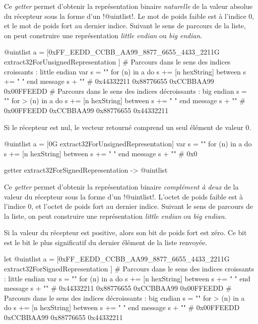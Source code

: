 Ce \emph{getter} permet d'obtenir la représentation binaire \emph{naturelle} de la valeur absolue du récepteur sous la forme d'un \ggst!@uintlist!. Le mot de poids faible est à l'indice $0$, et le mot de poids fort au dernier indice. Suivant le sens de parcours de la liste, on peut construire une représentation \emph{little endian} ou \emph{big endian}.

\begin{galgas3}
@uintlist a = [0xFF_EEDD_CCBB_AA99_8877_6655_4433_2211G
  extract32ForUnsignedRepresentation
]
# Parcours dans le sens des indices croissants : little endian
var s = ""
for (n) in a
  do s += [n hexString]
  between s += " "
end
message s + "\n" # 0x44332211 0x88776655 0xCCBBAA99 0x00FFEEDD
# Parcours dans le sens des indices décroissants : big endian
s = ""
for > (n) in a
  do s += [n hexString]
  between s += " "
end
message s + "\n" # 0x00FFEEDD 0xCCBBAA99 0x88776655 0x44332211
\end{galgas3}

Si le récepteur est nul, le vecteur retourné comprend un seul élément de valeur $0$.

\begin{galgas3}
@uintlist a = [0G extract32ForUnsignedRepresentation]
var s = ""
for (n) in a
  do s += [n hexString]
  between s += " "
end
message s + "\n" # 0x0
\end{galgas3}





\begin{galgas3box}
getter extract32ForSignedRepresentation -> @uintlist
\end{galgas3box}

Ce \emph{getter} permet d'obtenir la représentation binaire \emph{complément à deux} de la valeur du récepteur sous la forme d'un \ggst!@uintlist!. L'octet de poids faible est à l'indice $0$, et l'octet de poids fort au dernier indice. Suivant le sens de parcours de la liste, on peut construire une représentation \emph{little endian} ou \emph{big endian}.

Si la valeur du récepteur est positive, alors son bit de poids fort est zéro. Ce bit est le bit le plus significatif du dernier élément de la liste renvoyée.

\begin{galgas3}
let @uintlist a = [0xFF_EEDD_CCBB_AA99_8877_6655_4433_2211G
  extract32ForSignedRepresentation
]
# Parcours dans le sens des indices croissants : little endian
var s = ""
for (n) in a
  do s += [n hexString]
  between s += " "
end
message s + "\n" # 0x44332211 0x88776655 0xCCBBAA99 0x00FFEEDD
# Parcours dans le sens des indices décroissants : big endian
s = ""
for > (n) in a
  do s += [n hexString]
  between s += " "
end
message s + "\n" # 0x00FFEEDD 0xCCBBAA99 0x88776655 0x44332211
\end{galgas3}

